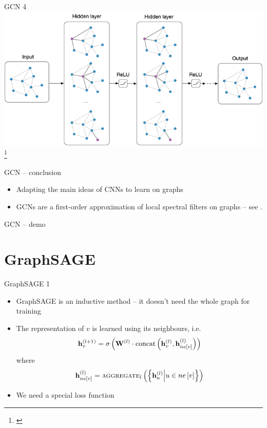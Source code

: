 \documentclass[10pt]{beamer}
\newcommand{\mathvec}{\ensuremath{\mathbf}}
\newcommand{\mathmat}{\ensuremath{\mathbf}}
\begin{document}
\begin{frame}{GCN 4}
	\centering
	\includegraphics[width=0.8\pagewidth]{images/GCN.png}\footnote{\cite{kipf_how_2016}}
\end{frame}

\begin{frame}{GCN -- conclusion}
	\begin{itemize}
		\item Adapting the main ideas of CNNs to learn on graphs
		\item GCNs are a first-order approximation of local spectral filters on graphs -- see \cite{kipf_semi-supervised_2017}.
	\end{itemize}
\end{frame}

\begin{frame}{GCN -- demo}
\end{frame}

\section{GraphSAGE}

\begin{frame}{GraphSAGE 1}
	\begin{itemize}
		\item GraphSAGE is an inductive method -- it doesn't need the whole graph for training
		\item The representation of \( v \) is learned using its neighbours, i.e.
			\[ \mathvec{h}_v^{(l + 1)} = \sigma \left( \mathmat{W}^{(l)} \cdot \mathrm{concat} \left( \mathvec{h}_v^{(l)}, \mathvec{h}_{ne \left[ v \right]}^{(l)} \right) \right) \]
			where
			\[ \mathvec{h}_{ne \left[ v \right]}^{(l)} = \textsc{aggregate}_l \left( \left\{ \mathvec{h}_u^{(l)} \middle| u \in ne \left[ v \right] \right\} \right) \]
		\item We need a special loss function
	\end{itemize}
\end{frame}
\end{document}
